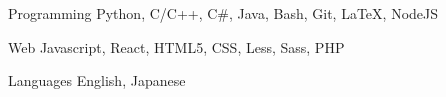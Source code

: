 

\begin{cvskills}

  \cvskill
    {Programming} %
    {Python, C/C++, C\#, Java, Bash, Git, LaTeX, NodeJS} %

  \cvskill
    {Web} %
    {Javascript, React, HTML5, CSS, Less, Sass, PHP} %

  \cvskill
    {Languages} %
    {English, Japanese} %

\end{cvskills}
